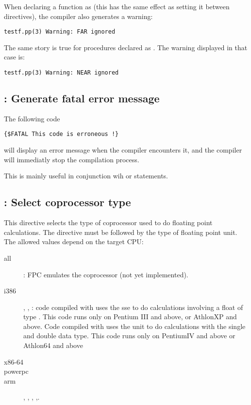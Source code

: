 When declaring a function as  (this has the same effect as setting it
between  directives), the compiler also generates a
warning:
\begin{verbatim}
testf.pp(3) Warning: FAR ignored
\end{verbatim}

The same story is true for procedures declared as . The warning
displayed in that case is:
\begin{verbatim}
testf.pp(3) Warning: NEAR ignored
\end{verbatim}

\subsection{ : Generate fatal error message}

The following code
\begin{verbatim}
{$FATAL This code is erroneous !}
\end{verbatim}
will display an error message when the compiler encounters it,
and the compiler will immediatly stop the compilation process.

This is mainly useful in conjunction wih  or
 statements.

\subsection{ : Select coprocessor type}

This directive selects the type of coprocessor used to do floating point
calculations. The directive must be followed by the type of floating point
unit. The allowed values depend on the target CPU:

\begin{description}
\item[all] : FPC emulates the coprocessor (not yet implemented).
\item[i386] , , : code compiled with  
uses the sse to do calculations involving a float of type .
This code runs only on Pentium III and above, or AthlonXP and above.
Code compiled with  uses the  unit to do calculations 
with the single and double data type. This code runs only on PentiumIV 
and above or Athlon64 and above 
\item[x86-64]  
\item[powerpc]  
\item[arm] , , , ,.
\end{description} 

